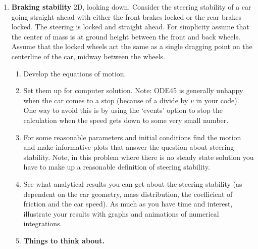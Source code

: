 \documentclass[11pt]{article}
\begin{document}
\begin{enumerate}
\begin{enumerate}
\begin{enumerate}
\end{enumerate}

\end{enumerate}





  \item{\bf Braking stability}\label{HWbrakingstability} 2D, looking down.  Consider the steering stability of a car going straight ahead with either the front brakes locked
or the rear brakes locked.  The steering is locked and straight ahead.  For simplicity
assume that the center of mass is at ground height between the front
and back wheels.  Assume that the locked wheels act the same as a single
dragging point on the centerline of the car, midway between the wheels. 

\begin{enumerate}
\item{Develop the equations of motion.  }


\item{Set them up for computer solution. Note:  ODE45 is generally unhappy when the car comes to a stop (because of a divide by $v$ in your code).  One way to avoid this is by using the `events' option to stop the calculation when the speed gets down to some very small number. } 


\item{For some reasonable parameters and initial conditions
find the motion and make informative plots that answer the question
about steering stability. Note, in this problem where there is no
steady state solution you have to make up a reasonable definition
of steering stability.} 


\item{See what analytical results you can get about the
steering stability (as dependent on the car geometry, mass distribution,
the coefficient of friction and the car speed).
As much as  you have time and interest, illustrate your results with graphs and animations of 
numerical integrations.}

\item \textbf{Things to think about.} 


\end{enumerate}
\end{enumerate}
\end{document}
